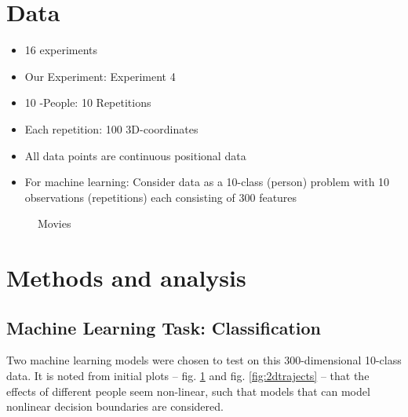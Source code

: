\documentclass[12pt,fleqn]{article}
\begin{document}
\section{Data}
\begin{itemize}
	\item 16 experiments
	\item Our Experiment: Experiment 4
	\item 10 -People: 10 Repetitions
	\item Each repetition: 100 3D-coordinates
	\item All data points are continuous positional data
	\item For machine learning: Consider data as a 10-class (person) problem with 10 observations (repetitions) each consisting of 300 features 
\end{itemize}
\begin{figure}[H]
		
	\centering
	\label{fig:trajects}
	\caption{Movies}
\end{figure}


\section{Methods and analysis}


\subsection{Machine Learning Task: Classification}
Two machine learning models were chosen to test on this 300-dimensional 10-class data.
It is noted from initial plots -- fig. \ref{fig:trajects} and fig. \ref{fig:2dtrajects} -- that the effects of different people seem non-linear, such that models that can model nonlinear decision boundaries are considered.
\end{document}
